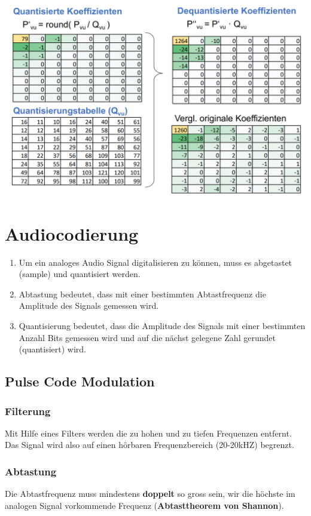 \begin{center}
    \includegraphics[width=1\linewidth]{images/dequantisierung.png}
\end{center}

\section{Audiocodierung}
\begin{enumerate}
    \item Um ein analoges Audio Signal digitalisieren zu können, muss es abgetastet (sample) und quantisiert werden.
    \item Abtastung bedeutet, dass mit einer bestimmten Abtastfrequenz die Amplitude des Signals gemessen wird.
    \item Quantisierung bedeutet, dass die Amplitude des Signals mit einer bestimmten Anzahl Bits gemessen wird und auf die nächst gelegene Zahl gerundet (quantisiert) wird.
\end{enumerate}

\subsection{Pulse Code Modulation}
\subsubsection{Filterung}
Mit Hilfe eines Filters werden die zu hohen und zu tiefen Frequenzen entfernt. Das Signal wird also auf einen hörbaren Frequenzbereich (20-20kHZ) begrenzt.
\subsubsection{Abtastung}
Die Abtastfrequenz muss mindestens \textbf{doppelt} so gross sein, wir die höchste im analogen Signal vorkommende Frequenz (\textbf{Abtasttheorem von Shannon}).
